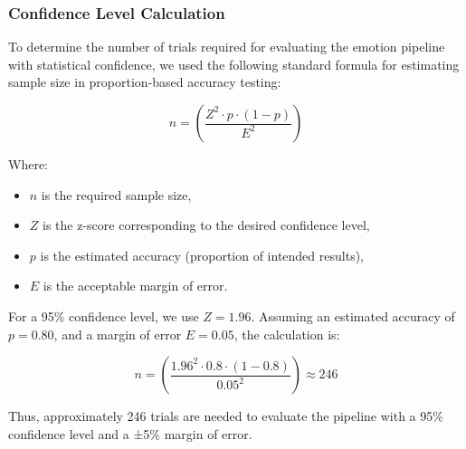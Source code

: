 \subsubsection{Confidence Level Calculation}
To determine the number of trials required for evaluating the emotion pipeline with statistical confidence, we used the following standard formula for estimating sample size in proportion-based accuracy testing:

\[
n = \left(\frac{Z^2 \cdot p\cdot(1 - p)}{E^2}\right)
\]

Where:
\begin{itemize}
    \item \( n \) is the required sample size,
    \item \( Z \) is the z-score corresponding to the desired confidence level,
    \item \( p \) is the estimated accuracy (proportion of intended results),
    \item \( E \) is the acceptable margin of error.
\end{itemize}

For a 95\% confidence level, we use \( Z = 1.96 \). Assuming an estimated accuracy of \( p = 0.80 \), and a margin of error \( E = 0.05 \), the calculation is:

\[
n = \left(\frac{1.96^2 \cdot 0.8 \cdot (1 - 0.8)}{0.05^2}\right)
\approx 246
\]

Thus, approximately 246 trials are needed to evaluate the pipeline with a 95\% confidence level and a ±5\% margin of error.

